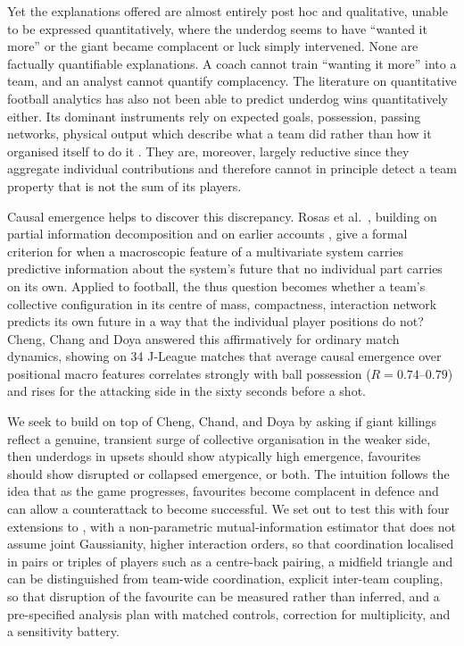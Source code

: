 \documentclass[11pt,a4paper]{article}
\begin{document}
Yet the explanations offered are almost entirely post hoc and qualitative, unable to be expressed quantitatively, where
the underdog seems to have ``wanted it more'' or the giant became complacent or luck simply intervened. 
None are factually quantifiable explanations. 
A coach cannot train ``wanting it more'' into a team, and an analyst cannot quantify
complacency. The literature on quantitative football analytics has also not been able to predict underdog wins quantitatively either. 
Its dominant instruments rely on expected goals, possession, passing networks, physical output
which describe what a team did rather than how it organised itself to do it
\cite{low2020,buldu2018}. They are, moreover, largely reductive since they aggregate individual
contributions and therefore cannot in principle detect a team property that is not the
sum of its players.

Causal emergence helps to discover this discrepancy. Rosas et al.\ \cite{rosas2020},
building on partial information decomposition \cite{williams2010} and on earlier
accounts \cite{hoel2013,seth2010}, give a formal criterion for when a
macroscopic feature of a multivariate system carries predictive information about the
system's future that no individual part carries on its own. Applied to football, the
thus question becomes whether a team's collective configuration in its centre of mass, 
compactness, interaction network predicts its own future in a way that the
individual player positions do not? Cheng, Chang and Doya \cite{cheng2025} answered this
affirmatively for ordinary match dynamics, showing on 34 J-League matches that
average causal emergence over positional macro features correlates strongly with ball
possession ($R=0.74$--$0.79$) and rises for the attacking side in the sixty seconds before
a shot.

We seek to build on top of Cheng, Chand, and Doya by asking if giant killings reflect a genuine, transient surge of collective organisation in the weaker side,
then underdogs in upsets should show atypically high emergence, favourites should show
disrupted or collapsed emergence, or both. The intuition follows the idea that as the game progresses, favourites become complacent in defence and can allow a counterattack to become successful.
We set out to test this with four extensions
to \cite{cheng2025}, with a non-parametric mutual-information estimator that does not assume
joint Gaussianity, higher interaction orders, so that coordination localised in pairs or
triples of players such as a centre-back pairing, a midfield triangle and can be distinguished
from team-wide coordination, explicit inter-team coupling, so that disruption of the
favourite can be measured rather than inferred, and a pre-specified analysis plan with
matched controls, correction for multiplicity, and a sensitivity battery.
\end{document}
